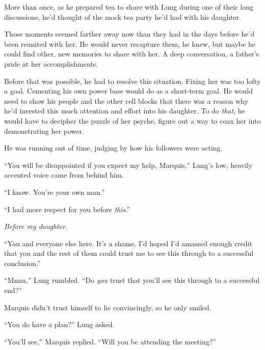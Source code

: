 More than once, as he prepared tea to share with Lung during one of their long discussions, he'd thought of the mock tea party he'd had with his daughter.



Those moments seemed farther away now than they had in the days before he'd been reunited with her.  He would never recapture them, he knew, but maybe he could find other, new memories to share with her.  A deep conversation, a father's pride at her accomplishments.



Before that was possible, he had to resolve this situation.  Fixing her was too lofty a goal.  Cementing his own power base would do as a short-term goal.  He would need to show his people and the other cell blocks that there was a reason why he'd invested this much attention and effort into his daughter.  To do \emph{that}, he would have to decipher the puzzle of her psyche, figure out a way to coax her into demonstrating her power.



He was running out of time, judging by how his followers were acting.



``You will be disappointed if you expect my help, Marquis,'' Lung's low, heavily accented voice came from behind him.



``I know.  You're your own man.''



``I had more respect for you before \emph{this}.''



\emph{Before my daughter.}



``You and everyone else here.  It's a shame.  I'd hoped I'd amassed enough credit that you and the rest of them could trust me to see this through to a successful conclusion.''



``Mmm,'' Lung rumbled.  ``Do \emph{you} trust that you'll see this through to a successful end?''



Marquis didn't trust himself to lie convincingly, so he only smiled.



``You do have a plan?'' Lung asked.



``You'll see,'' Marquis replied.  ``Will you be attending the meeting?''



